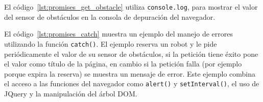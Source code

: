 El código~\ref{lst:promises_get_obstacle} utiliza \texttt{console.log},
para mostrar el valor del sensor de obstáculos en la consola de depuración
del navegador.






El código~\ref{lst:promises_catch} muestra un ejemplo del manejo de errores
utilizando la función \texttt{catch()}. El ejemplo reserva un robot y
le pide periódicamente el valor de su sensor de obstáculos, si la petición tiene
éxito pone el valor como título de la página, en cambio si la petición falla
(por ejemplo porque expira la reserva) se muestra un mensaje de error.
Este ejemplo combina el acceso
a las funciones del navegador como \texttt{alert()} y \texttt{setInterval()},
el uso de JQuery y la manipulación del árbol DOM.

